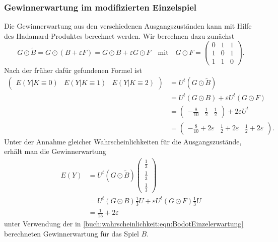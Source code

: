 \subsubsection{Gewinnerwartung im modifizierten Einzelspiel}
Die Gewinnerwartung aus den verschiedenen Ausgangszuständen kann mit Hilfe
des Hadamard-Produktes berechnet werden.
Wir berechnen dazu zunächst
\[
G\odot \tilde{B}
=
G\odot (B+\varepsilon F)
=
G\odot B + \varepsilon G\odot F
\quad\text{mit}\quad
G\odot F = \begin{pmatrix}
0&1&1\\
1&0&1\\
1&1&0
\end{pmatrix}.
\]
Nach der früher dafür gefundenen Formel ist
\begin{align*}
\begin{pmatrix}
E(Y|K\equiv 0)&
E(Y|K\equiv 1)&
E(Y|K\equiv 2)
\end{pmatrix}
&=
U^t (G\odot \tilde{B})
\\
&=
U^t (G\odot B)
+
\varepsilon
U^t (G\odot F)
\\
&=
\begin{pmatrix} -\frac{8}{10}&\frac12&\frac12 \end{pmatrix}
+
2\varepsilon U^t
\\
&=
\begin{pmatrix} -\frac{8}{10}+2\varepsilon&\frac12+2\varepsilon&\frac12+2\varepsilon \end{pmatrix}.
\end{align*}
Unter der Annahme gleicher Wahrscheinlichkeiten für die Ausgangszustände,
erhält man die Gewinnerwartung
\begin{align*}
E(Y)
&=
U^t(G\odot \tilde{B})
\begin{pmatrix}
\frac13\\
\frac13\\
\frac13
\end{pmatrix}
\\
&=
U^t
(G\odot B)
\frac13 U
+
\varepsilon
U^t
(G\odot F)
\frac13 U
\\
&=
\frac1{15}
+
2\varepsilon
\end{align*}
unter Verwendung der in
\eqref{buch:wahrscheinlichkeit:eqn:BodotEinzelerwartung}
berechneten Gewinnerwartung für das Spiel $B$.

